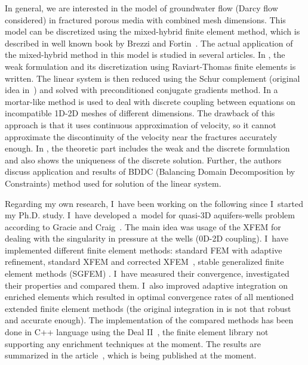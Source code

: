 \documentclass{sna}
\begin{document}
In general, we are interested in the model of groundwater flow (Darcy flow considered) in fractured porous media with combined mesh dimensions.
This model can be discretized using the mixed-hybrid finite element method, which is described in
well known book by Brezzi and Fortin~\cite{brezzi_mixed_1991}. 
The actual application of the mixed-hybrid method in this model is studied in several articles.
In \cite{brezina_mixed-hybrid_2010}, the weak formulation and its discretization using Raviart-Thomas finite 
elements is written. The linear system is then reduced using the Schur complement (original idea in~\cite{maryska_mixed-hybrid_1995})
and solved with preconditioned conjugate gradients method.
In \cite{brezina_2012} a mortar-like method is used to deal with discrete coupling between equations on incompatible 1D-2D meshes 
of different dimensions. The drawback of this approach is that it uses continuous approximation of velocity, so
it cannot approximate the discontinuity of the velocity near the fractures accurately enough.
In \cite{sistek_bddc_2015}, the theoretic part includes the weak and the discrete formulation and also shows
the uniqueness of the discrete solution. Further, the authors discuss application and results of BDDC 
(Balancing Domain Decomposition by Constraints) method used for solution of the linear system.


Regarding my own research, I~have been working on the following since I~started my Ph.D. study. 
I~have developed a~model for quasi-3D aquifers-wells problem according to Gracie and Craig~\cite{gracie_modelling_2010,craig_using_2011}.
The main idea was usage of the XFEM for dealing with the singularity in pressure at the wells (0D-2D coupling).
I~have implemented different finite element methods: standard FEM with adaptive refinement, 
standard XFEM and corrected XFEM~\cite{fries_corrected_2008,fries_xfem_overview_2010},
stable generalized finite element methods (SGFEM) \cite{babuska_stable_2012, gupta_stable_2013}.
I~have measured their convergence, investigated their properties and compared them. 
I~also improved adaptive integration on enriched elements which resulted in optimal convergence rates of
all mentioned extended finite element methods (the original integration in \cite{gracie_modelling_2010,craig_using_2011}
is not that robust and accurate enough). 
The implementation of the compared methods has been done in C++ language using the Deal II~\cite{bangerth_deal.ii_2007}, 
the finite element library not supporting any enrichment techniques at the moment.
The results are summarized in the article~\cite{exner_2015}, which is being published at the moment.
\end{document}
